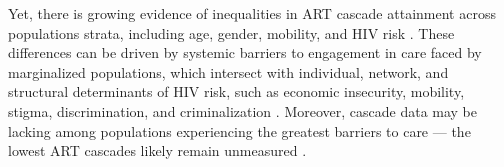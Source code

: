 \par
Yet, there is growing evidence of inequalities in ART cascade attainment across populations strata,
including age, gender, mobility, and HIV risk \cite{Hakim2018,Green2020}.
These differences can be driven by
systemic barriers to engagement in care faced by marginalized populations,
which intersect with individual, network, and structural determinants of HIV risk,
such as economic insecurity, mobility, stigma, discrimination, and criminalization
\cite{Wanyenze2016,Schwartz2017,Schmidt-Sane2022}.
Moreover, cascade data may be lacking among populations experiencing the greatest barriers to care
--- \ie the lowest ART cascades likely remain unmeasured \cite{Hakim2018,Boothe2021}.
